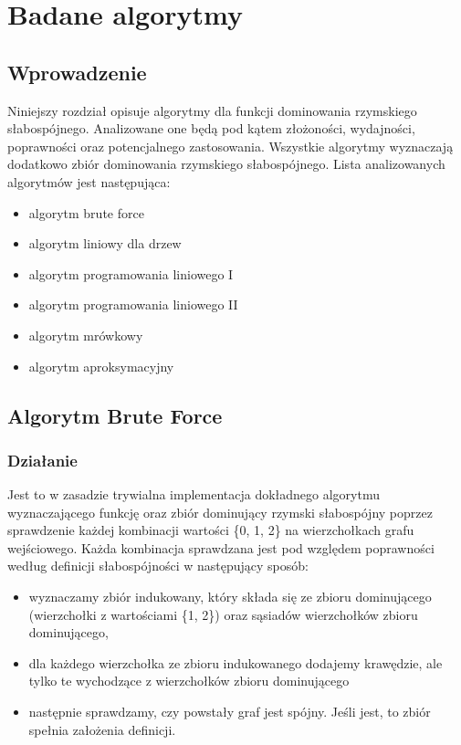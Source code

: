 \chapter{Badane algorytmy}

\section{Wprowadzenie}
Niniejszy rozdział opisuje algorytmy dla funkcji dominowania rzymskiego słabospójnego. Analizowane one będą pod kątem złożoności, wydajności, poprawności oraz potencjalnego zastosowania. Wszystkie algorytmy wyznaczają dodatkowo zbiór dominowania rzymskiego słabospójnego. Lista analizowanych algorytmów jest następująca:

\begin{itemize}
    \item algorytm brute force
    \item algorytm liniowy dla drzew
    \item algorytm programowania liniowego I
    \item algorytm programowania liniowego II
    \item algorytm mrówkowy
    \item algorytm aproksymacyjny
\end{itemize}

\section{Algorytm Brute Force}

\subsection{Działanie}
Jest to w zasadzie trywialna implementacja dokładnego algorytmu wyznaczającego funkcję oraz zbiór dominujący rzymski słabospójny poprzez sprawdzenie każdej kombinacji wartości \{0, 1, 2\} na wierzchołkach grafu wejściowego. Każda kombinacja sprawdzana jest pod względem poprawności według definicji słabospójności w następujący sposób:
\begin{itemize}
    \item wyznaczamy zbiór indukowany, który składa się ze zbioru dominującego (wierzchołki z wartościami \{1, 2\}) oraz sąsiadów wierzchołków zbioru dominującego,
    \item dla każdego wierzchołka ze zbioru indukowanego dodajemy krawędzie, ale tylko te wychodzące z wierzchołków zbioru dominującego
    \item następnie sprawdzamy, czy powstały graf jest spójny. Jeśli jest, to zbiór spełnia założenia definicji.
\end{itemize}

